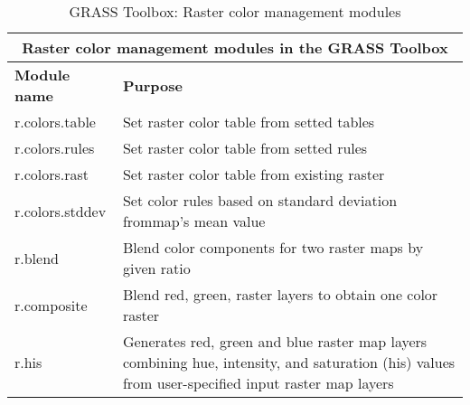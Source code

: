 \begin{table}[ht]
\centering
\caption{GRASS Toolbox: Raster color management modules}\medskip
 \begin{tabular}{|p{4cm}|p{12cm}|}
  \hline \multicolumn{2}{|c|}{\textbf{Raster color management modules in the
  GRASS Toolbox}} \\
  \hline \textbf{Module name} & \textbf{Purpose} \\
  \hline r.colors.table & Set raster color table from setted tables \\
  \hline r.colors.rules & Set raster color table from setted rules \\
  \hline r.colors.rast & Set raster color table from existing raster \\
  \hline r.colors.stddev & Set color rules based on standard deviation frommap's mean value \\
  \hline r.blend & Blend color components for two raster maps by given ratio \\
  \hline r.composite & Blend red, green, raster layers to obtain one color
  raster \\
  \hline r.his & Generates red, green and blue raster map layers combining
  hue, intensity, and saturation (his) values from user-specified input
  raster map layers \\
\hline
\end{tabular}
\end{table}

